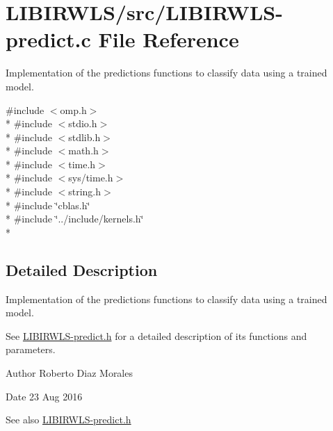 \hypertarget{LIBIRWLS-predict_8c}{}\section{L\+I\+B\+I\+R\+W\+L\+S/src/\+L\+I\+B\+I\+R\+W\+L\+S-\/predict.c File Reference}
\label{LIBIRWLS-predict_8c}


Implementation of the predictions functions to classify data using a trained model.  


{\ttfamily \#include $<$omp.\+h$>$}\\*
{\ttfamily \#include $<$stdio.\+h$>$}\\*
{\ttfamily \#include $<$stdlib.\+h$>$}\\*
{\ttfamily \#include $<$math.\+h$>$}\\*
{\ttfamily \#include $<$time.\+h$>$}\\*
{\ttfamily \#include $<$sys/time.\+h$>$}\\*
{\ttfamily \#include $<$string.\+h$>$}\\*
{\ttfamily \#include \char`\"{}cblas.\+h\char`\"{}}\\*
{\ttfamily \#include \char`\"{}../include/kernels.\+h\char`\"{}}\\*


\subsection{Detailed Description}
Implementation of the predictions functions to classify data using a trained model. 

See \hyperlink{LIBIRWLS-predict_8h}{L\+I\+B\+I\+R\+W\+L\+S-\/predict.\+h} for a detailed description of its functions and parameters.

\begin{DoxyAuthor}{Author}
Roberto Diaz Morales 
\end{DoxyAuthor}
\begin{DoxyDate}{Date}
23 Aug 2016
\end{DoxyDate}
\begin{DoxySeeAlso}{See also}
\hyperlink{LIBIRWLS-predict_8h}{L\+I\+B\+I\+R\+W\+L\+S-\/predict.\+h} 
\end{DoxySeeAlso}
